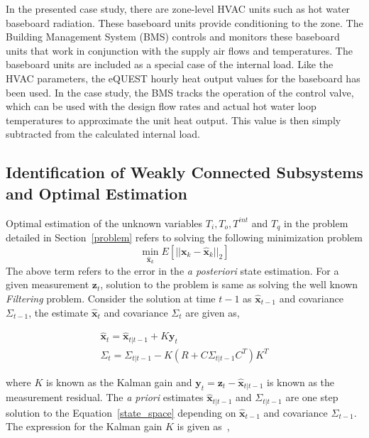 In the presented case study, there are zone-level HVAC units such as hot water baseboard radiation. These baseboard units provide conditioning to the zone.  The Building Management System (BMS) controls and monitors these baseboard units that work in conjunction with the supply air flows and temperatures.  The baseboard units are included as a special case of the internal load. Like the HVAC parameters, the eQUEST hourly heat output values for the baseboard has been used.  In the case study, the BMS tracks the operation of the control valve, which can be used with the design flow rates and actual hot water loop temperatures to approximate the unit heat output.  This value is then simply subtracted from the calculated internal load.  

\subsection{Identification of Weakly Connected Subsystems and Optimal Estimation}
\label{WCS}

Optimal estimation of the unknown variables $T_i,T_o, T^{int}$ and $T_q$ in the problem detailed in Section~\ref{problem} refers to solving the following minimization problem
\begin{equation}
\displaystyle \min_{\hat{\textbf{x}}_k} E\left[|| \textbf{x}_k - \hat{\textbf{x}}_k ||_2 \right]
\end{equation}
\noindent The above term refers to the error in the \textit{a posteriori} state estimation. For a given measurement $\textbf{z}_t$, solution to the problem is same as solving the well known \textit{Filtering} problem. Consider the solution at time $t-1$ as $\hat{\textbf{x}}_{t-1}$ and covariance $\Sigma_{t-1}$, the estimate $\hat{\textbf{x}}_t$ and covariance $\Sigma_t$ are given as,

\begin{equation}
\label{kalman_full}
\begin{array}{l}
\hat{\textbf{x}}_t = \hat{\textbf{x}}_{t|t-1} + K\textbf{y}_{t} \\
\Sigma_t = \Sigma_{t|t-1} - K (R + C \Sigma_{t|t-1} C^T)  K^T
\end{array}
\end{equation}

\noindent where $K$ is known as the Kalman gain and $\textbf{y}_t = \textbf{z}_t - \hat{\textbf{x}}_{t|t-1}$ is known as the measurement residual. The \textit{a priori} estimates $\hat{\textbf{x}}_{t|t-1}$ and $\Sigma_{t|t-1}$ are one step solution to the Equation~\ref{state_space} depending on $\hat{\textbf{x}}_{t-1}$ and covariance $\Sigma_{t-1}$. The expression for the Kalman gain $K$ is given as~\citep{kalman1960new},

